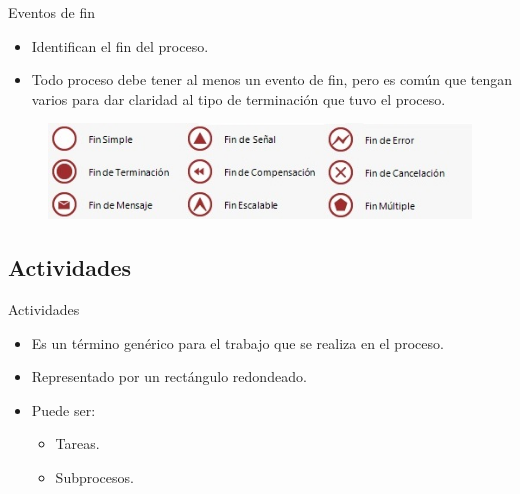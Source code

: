\begin{frame}{Eventos de fin}
    \begin{itemize}
        \item Identifican el fin del proceso. 
        \item Todo proceso debe tener al menos un evento de fin, pero es común que tengan varios para dar claridad al tipo de terminación que tuvo el proceso.
    \end{itemize}
    \begin{figure}
        \centering
        \includegraphics[scale=0.8]{images/event_final.jpg}
    \end{figure}
\end{frame}

\subsection{Actividades}

\begin{frame}{Actividades}
    \begin{itemize}
        \item Es un término genérico para el trabajo que se realiza en el proceso. 
        \item Representado por un rectángulo redondeado. 
        \item Puede ser:
            \begin{itemize}
                \item Tareas.
                \item Subprocesos.
            \end{itemize}
    \end{itemize}
    
\end{frame}

